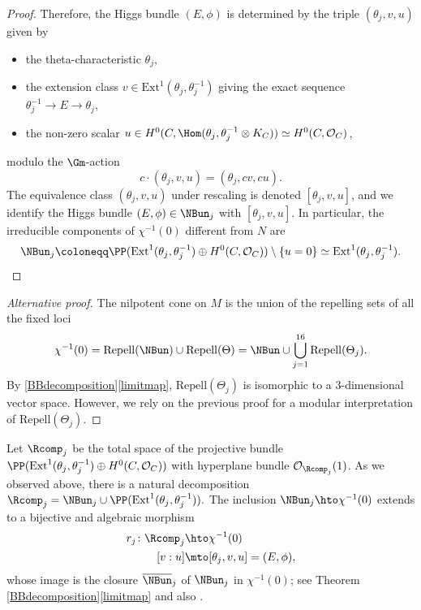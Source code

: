 \begin{proof}
Therefore, the Higgs bundle $(E, \phi)$ is determined by the triple $(\theta_j, v, u)$ given by
\begin{itemize}
\item the theta-characteristic $\theta_j$,
\item the extension class $v \in \mathrm{Ext}^1(\theta_j, \theta^{-1}_j)$ giving the exact sequence $\theta^{-1}_j \to E\to \theta_j$,
\item the non-zero scalar $u \in H^0(C, \Hom(\theta_j, \theta^{-1}_j \otimes K_C)) \simeq H^0(C, \mathcal{O}_C)$,
\end{itemize}
modulo the $\Gm$\nobreakdash-action
\[
c \cdot (\theta_j, v, u)=(\theta_j, cv, cu).
\]
The equivalence class $(\theta_j, v, u)$ under rescaling is denoted $[\theta_j, v, u]$, and we identify the Higgs bundle $(E, \phi) \in \NBun_j$ with $[\theta_j, v, u]$. In particular, the irreducible components of $\chi^{-1}(0)$ different from $N$ are
\[
\NBun_j \coloneqq \PP(\mathrm{Ext}^1(\theta_j, \theta^{-1}_j) \oplus H^0(C, \mathcal{O}_C))\setminus \{u=0\} \simeq \mathrm{Ext}^1(\theta_j, \theta^{-1}_j).\qedhere
\]
\end{proof}

\begin{proof}[Alternative proof]
The nilpotent cone on $M$ is the union of the repelling sets of all the fixed loci
\[
\chi^{-1}(0)= \mathrm{Repell}(\NBun) \cup \mathrm{Repell}(\Theta) = \NBun \cup \bigcup^{16}_{j=1}\mathrm{Repell}(\Theta_j).
\]
By \cref{BBdecomposition}\eqref{limitmap}, $\mathrm{Repell}(\Theta_j)$ is isomorphic to a $3$-dimensional vector space. However, we rely on the previous proof for a modular interpretation of $\mathrm{Repell}(\Theta_j)$.
\end{proof}
Let $\Rcomp_j$ be the total space of the projective bundle
$\PP(\mathrm{Ext}^1(\theta_j, \theta^{-1}_j) \oplus H^0(C, \mathcal{O}_C))$ with hyperplane bundle $\mathcal{O}_{\Rcomp_j}(1)$.
As we observed above, there is a natural decomposition
$
\Rcomp_j = \NBun_j \cup \PP(\mathrm{Ext}^1(\theta_j, \theta^{-1}_j)).
$
The inclusion $\NBun_j \hto \chi^{-1}(0)$ extends to a bijective and algebraic morphism
\begin{align*}
r_j \colon \Rcomp_j & \hto \chi^{-1}(0)\\
[v:u] & \mto [\theta_j, v, u]=(E, \phi),
\end{align*}
whose image is the closure $\overline{\NBun}_j$ of $\NBun_j$ in $\chi^{-1}(0)$; see Theorem \ref{BBdecomposition}\eqref{limitmap} and also \cite[Prop.\,24]{Thaddeus89}.

